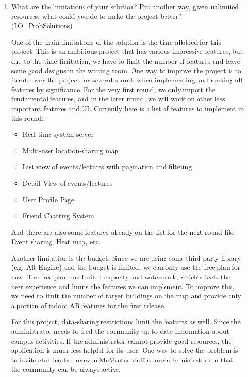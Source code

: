 \documentclass[12pt, titlepage]{article}
\begin{document}
\begin{enumerate}
  \item What are the limitations of your solution?  Put another way, given
  unlimited resources, what could you do to make the project better? (LO\_ProbSolutions)
  
	One of the main limitations of the solution is the time allotted for this project. This is an ambitious project that has various impressive features, but due to the time limitation, we have to limit the number of features and leave some good designs in the waiting room. One way to improve the project is to iterate over the project for several rounds when implementing and ranking all features by significance. For the very first round, we only import the fundamental features, and in the later round, we will work on other less important features and UI. Currently here is a list of features to implement in this round:
	\begin{itemize}
	\item Real-time system server
	\item Multi-user location-sharing map
	\item List view of events/lectures with pagination and filtering
	\item Detail View of events/lectures
	\item User Profile Page
	\item Friend Chatting System
	\end{itemize}
 And there are also some features already on the list for the next round
 like Event sharing, Heat map, etc.
 
 	Another limitation is the budget. Since we are using some third-party library (e.g. AR Engine) and the budget is limited, we can only use the free plan for now. The free plan has limited capacity and watermark, which affects the user experience and limits the features we can implement. To improve this, we need to limit the number of target buildings on the map and provide only a portion of indoor AR features for the first release.
 	
 	For this project, data-sharing restrictions limit the features as well. Since the administrator needs to feed the community up-to-date information about campus activities. If the administrator cannot provide good resources, the application is much less helpful for its user. One way to solve the problem is to invite club leaders or even McMaster staff as our administrators so that the community can be always active.


\end{enumerate}
\end{document}
